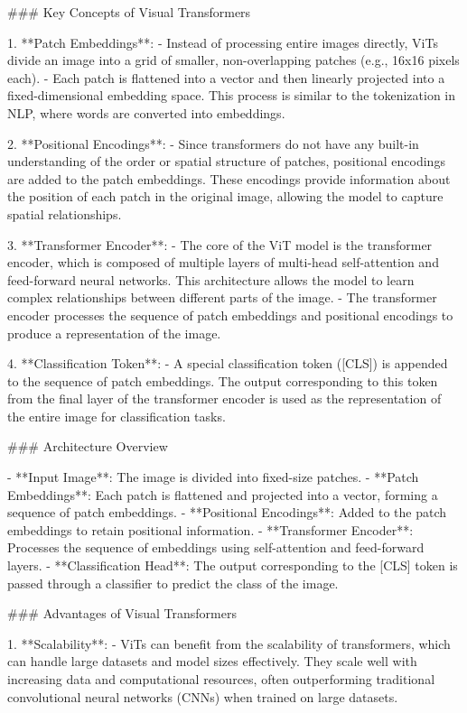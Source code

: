 ### Key Concepts of Visual Transformers

1. **Patch Embeddings**:
   - Instead of processing entire images directly, ViTs divide an image into a grid of smaller, non-overlapping patches (e.g., 16x16 pixels each).
   - Each patch is flattened into a vector and then linearly projected into a fixed-dimensional embedding space. This process is similar to the tokenization in NLP, where words are converted into embeddings.

2. **Positional Encodings**:
   - Since transformers do not have any built-in understanding of the order or spatial structure of patches, positional encodings are added to the patch embeddings. These encodings provide information about the position of each patch in the original image, allowing the model to capture spatial relationships.

3. **Transformer Encoder**:
   - The core of the ViT model is the transformer encoder, which is composed of multiple layers of multi-head self-attention and feed-forward neural networks. This architecture allows the model to learn complex relationships between different parts of the image.
   - The transformer encoder processes the sequence of patch embeddings and positional encodings to produce a representation of the image.

4. **Classification Token**:
   - A special classification token ([CLS]) is appended to the sequence of patch embeddings. The output corresponding to this token from the final layer of the transformer encoder is used as the representation of the entire image for classification tasks.

### Architecture Overview

- **Input Image**: The image is divided into fixed-size patches.
- **Patch Embeddings**: Each patch is flattened and projected into a vector, forming a sequence of patch embeddings.
- **Positional Encodings**: Added to the patch embeddings to retain positional information.
- **Transformer Encoder**: Processes the sequence of embeddings using self-attention and feed-forward layers.
- **Classification Head**: The output corresponding to the [CLS] token is passed through a classifier to predict the class of the image.

### Advantages of Visual Transformers

1. **Scalability**:
   - ViTs can benefit from the scalability of transformers, which can handle large datasets and model sizes effectively. They scale well with increasing data and computational resources, often outperforming traditional convolutional neural networks (CNNs) when trained on large datasets.

